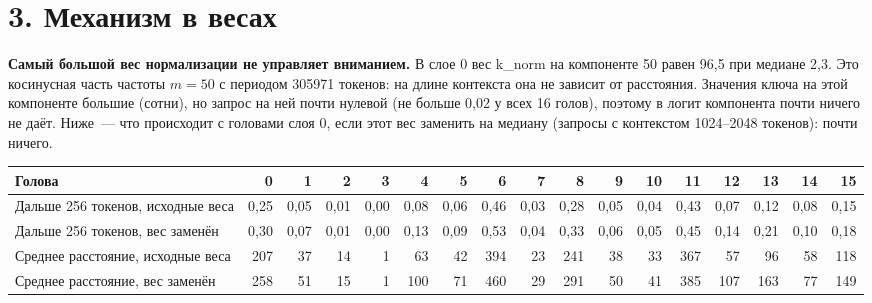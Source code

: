 \documentclass[10pt]{article}
\begin{document}
\section*{3. Механизм в весах}
\noindent\begin{minipage}{\linewidth}
\textbf{Самый большой вес нормализации не управляет вниманием.} В слое 0 вес k\_norm на компоненте 50 равен 96,5 при медиане 2,3. Это косинусная часть частоты $m{=}50$ с периодом 305971 токенов: на длине контекста она не зависит от расстояния. Значения ключа на этой компоненте большие (сотни), но запрос на ней почти нулевой (не больше 0,02 у всех 16 голов), поэтому в логит компонента почти ничего не даёт. Ниже~— что происходит с головами слоя 0, если этот вес заменить на медиану (запросы с контекстом 1024–2048 токенов): почти ничего.
\begin{center}\begin{tabular}{|l|r|r|r|r|r|r|r|r|r|r|r|r|r|r|r|r|}\hline \rowcolor{head}\textbf{Голова} & \textbf{0} & \textbf{1} & \textbf{2} & \textbf{3} & \textbf{4} & \textbf{5} & \textbf{6} & \textbf{7} & \textbf{8} & \textbf{9} & \textbf{10} & \textbf{11} & \textbf{12} & \textbf{13} & \textbf{14} & \textbf{15} \\ \hline
Дальше 256 токенов, исходные веса & 0,25 & 0,05 & 0,01 & 0,00 & 0,08 & 0,06 & 0,46 & 0,03 & 0,28 & 0,05 & 0,04 & 0,43 & 0,07 & 0,12 & 0,08 & 0,15 \\ \hline
Дальше 256 токенов, вес заменён & 0,30 & 0,07 & 0,01 & 0,00 & 0,13 & 0,09 & 0,53 & 0,04 & 0,33 & 0,06 & 0,05 & 0,45 & 0,14 & 0,21 & 0,10 & 0,18 \\ \hline
Среднее расстояние, исходные веса & 207 & 37 & 14 & 1 & 63 & 42 & 394 & 23 & 241 & 38 & 33 & 367 & 57 & 96 & 58 & 118 \\ \hline
Среднее расстояние, вес заменён & 258 & 51 & 15 & 1 & 100 & 71 & 460 & 29 & 291 & 50 & 41 & 385 & 107 & 163 & 77 & 149 \\ \hline\end{tabular}\end{center}
\end{minipage}
\par
\end{document}
